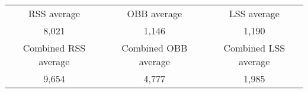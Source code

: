 \begin{tabular}{c|c|c}\\ 
RSS average & OBB average & LSS average\\ 
8,021 & 1,146 & 1,190\\ 
\hline 
Combined RSS average & Combined OBB average & Combined LSS average\\ 
9,654 & 4,777 & 1,985\\ 
\end{tabular}